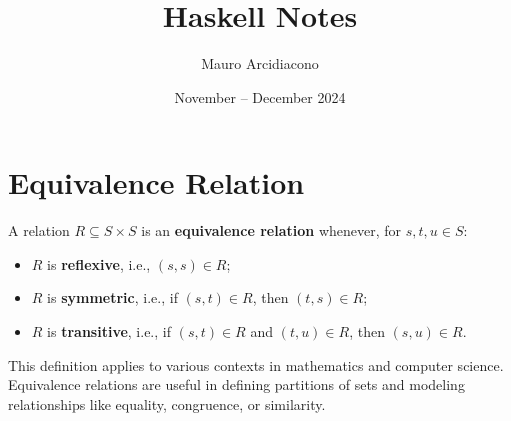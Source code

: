 \documentclass{article}
\title{\textbf{Haskell Notes}}
\author{Mauro Arcidiacono}
\date{November -- December 2024}
\begin{document}
\maketitle

\section*{Equivalence Relation}

A relation $R \subseteq S \times S$ is an \textbf{equivalence relation} whenever, for $s, t, u \in S$:
\begin{itemize}
    \item $R$ is \textbf{reflexive}, i.e., $(s, s) \in R$;
    \item $R$ is \textbf{symmetric}, i.e., if $(s, t) \in R$, then $(t, s) \in R$;
    \item $R$ is \textbf{transitive}, i.e., if $(s, t) \in R$ and $(t, u) \in R$, then $(s, u) \in R$.
\end{itemize}

This definition applies to various contexts in mathematics and computer science. Equivalence relations are useful in defining partitions of sets and modeling relationships like equality, congruence, or similarity.
\end{document}
